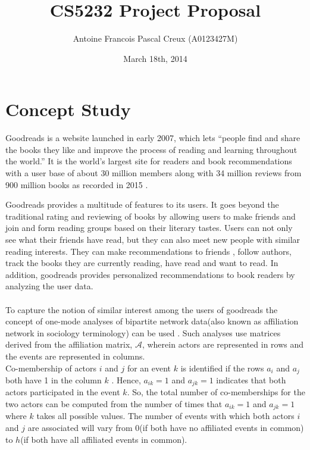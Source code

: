 \documentclass[12pt]{article}
\title{\textbf{CS5232 Project Proposal\\} }
\author{Antoine Francois Pascal Creux (A0123427M)}
\date{March 18th, 2014}
\begin{document}
\maketitle


\section{Concept Study}

Goodreads is a website launched in early 2007, which lets ``people find and share the books they like and improve the process of reading and learning throughout the world.'' It is the world’s largest site for readers and book recommendations with a user base of about  30 million members along with 34 million reviews from 900 million books as recorded in 2015 \cite{goodreads:aboutus}.

Goodreads provides a multitude of features to its users. It goes beyond the traditional rating and reviewing of books by allowing users to make friends and join and form reading groups based on their literary tastes. Users can not only see what their friends have read, but they can also meet new people with similar reading interests. They can make recommendations to friends , follow authors, track the books they are currently reading, have read and want to read. In addition, goodreads provides personalized recommendations to book readers by analyzing the user data. \\\\

To capture the notion of similar interest among the users of goodreads  the concept of one-mode analyses of bipartite network data(also known as affiliation network in sociology terminology) can be used \cite{wasserman}. Such analyses use matrices derived from the affiliation matrix, $\mathcal{A}$, wherein actors are represented in rows and the events are represented in columns.\\

Co-membership of actors $i$ and $j$ for an event $k$ is identified if the rows $a_i$ and $a_j$ both have 1 in the column $k$ . Hence,  $a_{ik} = 1$ and $a_{jk} = 1$ indicates that both actors participated in the event $k$. So, the total number of co-memberships for the two actors can be computed from the number of times that $a_{ik} = 1$ and $a_{jk} = 1$ where $k$ takes all possible values. The number of events with which both actors $i$ and $j$ are associated will vary from  0(if both have no affiliated events in common) to $h$(if both have all affiliated events in common).\\\\
\end{document}
